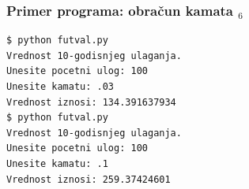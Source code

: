 \documentclass[utf8,compress]{beamer}
\begin{document}
\begin{frame}[fragile]
  \frametitle{Primer programa: obračun kamata $_6$}
\begin{verbatim}
$ python futval.py
Vrednost 10-godisnjeg ulaganja.
Unesite pocetni ulog: 100
Unesite kamatu: .03
Vrednost iznosi: 134.391637934
$ python futval.py
Vrednost 10-godisnjeg ulaganja.
Unesite pocetni ulog: 100
Unesite kamatu: .1
Vrednost iznosi: 259.37424601
\end{verbatim}
\end{frame}
\end{document}
